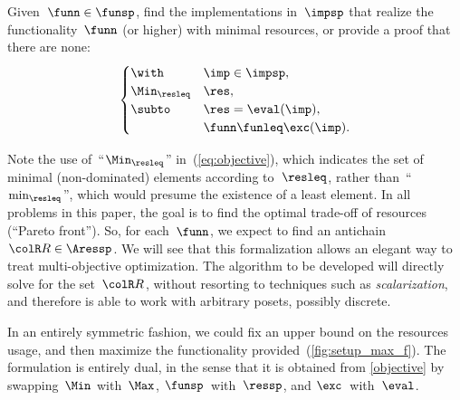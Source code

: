 \begin{problem}[FixFunMinReq]
\label{prob:problem1}Given~$\funn\in\funsp$, find the implementations
in~$\impsp$ that realize the functionality~$\funn$ (or higher)
with minimal resources, or provide a proof that there are none:
\begin{equation}
\begin{cases}
\with & \imp\in\impsp,\\
\Min_{\resleq} & \res,\\
\subto & \res=\eval(\imp),\\
 & \funn\funleq\exc(\imp).
\end{cases}\label{eq:objective}
\end{equation}
\end{problem}


\begin{remark}
Note the use of~``$\Min_{\resleq}$'' in~(\ref{eq:objective}),
which indicates the set of minimal (non-dominated) elements according
to~$\resleq$, rather than~``$\min_{\resleq}$'', which would
presume the existence of a least element. In all problems in this
paper, the goal is to find the optimal trade-off of resources (``Pareto
front''). So, for each~$\funn$, we expect to find an antichain~${\colR R}\in\Aressp$.
We will see that this formalization allows an elegant way to treat
multi-objective optimization. The algorithm to be developed will directly
solve for the set~${\colR R}$, without resorting to techniques such
as \emph{scalarization}, and therefore is able to work with arbitrary
posets, possibly discrete.
\end{remark}


In an entirely symmetric fashion, we could fix an upper bound on
the resources usage, and then maximize the functionality provided~(\cref{fig:setup_max_f}).
The formulation is entirely dual, in the sense that it is obtained
from \eqref{objective} by swapping~$\Min$ with~$\Max$, $\funsp$~with~$\ressp$,
and $\exc$~with~$\eval$.

